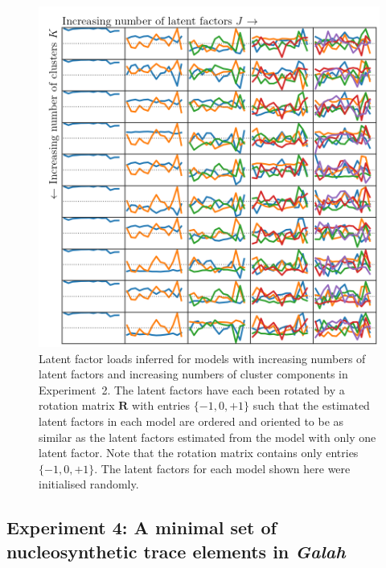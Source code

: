 \documentclass[twocolumn]{aastex61}
\newcommand{\project}[1]{\textsl{#1}}
\newcommand{\Galah}{\project{Galah}}
\begin{document}
\begin{figure}
	\includegraphics[width=1.0\textwidth]{experiments/galah-experiment-2-gridsearch-factors-wrt-J-and-K.png}
	\caption{Latent factor loads inferred for models with increasing numbers
			 of latent factors and increasing numbers of cluster components
			 in Experiment~2. The latent factors have each been rotated by a
			 rotation matrix $\textbf{R}$ with entries $\{-1, 0, +1\}$ such 
			 that the estimated latent factors in each model are ordered 
			 and oriented to be as similar as the latent factors estimated from
			 the model with only one latent factor. Note that the rotation
			 matrix contains only entries $\{-1, 0, +1\}$. The latent
			 factors for each model shown here were initialised randomly.
			 }
	\label{fig:experiment-2-gridsearch-factors-init-svd}
\end{figure}



\subsection{Experiment 4: A minimal set of nucleosynthetic trace elements in \Galah}
\end{document}
